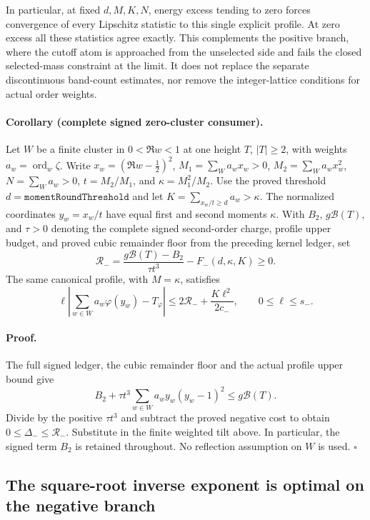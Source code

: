 In particular, at fixed \(d,M,K,N\), energy excess tending to zero forces
convergence of every Lipschitz statistic to this single explicit profile.
At zero excess all these statistics agree exactly.  This complements the
positive branch, where the cutoff atom is approached from the unselected
side and fails the closed selected-mass constraint at the limit.
It does not replace the separate discontinuous band-count estimates,
nor remove the integer-lattice conditions for actual order weights.

\paragraph{Corollary (complete signed zero-cluster consumer).}
Let \(W\) be a finite cluster in \(0<\Re w<1\) at one height \(T\),
\(|T|\ge2\), with weights \(a_w=\operatorname{ord}_w\zeta\).
Write \(x_w=(\Re w-\tfrac12)^2\),
\(M_1=\sum_Wa_wx_w>0\), \(M_2=\sum_Wa_wx_w^2\),
\(N=\sum_Wa_w>0\), \(t=M_2/M_1\), and
\(\kappa=M_1^2/M_2\).
Use the proved threshold \(d=\texttt{momentRoundThreshold}\) and let
\(K=\sum_{x_w/t\ge d}a_w>\kappa\).
The normalized coordinates \(y_w=x_w/t\) have equal first and
second moments \(\kappa\).
With \(B_2\), \(g\mathcal B(T)\), and \(\tau>0\) denoting the
complete signed second-order charge, profile upper budget, and proved
cubic remainder floor from the preceding kernel ledger, set
\[
 \mathcal R_-=
 \frac{g\mathcal B(T)-B_2}{\tau t^3}
       -F_-(d,\kappa,K)\ge0.
\]
The same canonical profile, with \(M=\kappa\), satisfies
\[
 \ell\left|\sum_{w\in W}a_w\varphi(y_w)-T_\varphi\right|
 \le2\mathcal R_-+\frac{K\ell^2}{2c_-},
 \qquad 0\le\ell\le s_-.
\]

\paragraph{Proof.}
The full signed ledger, the cubic remainder floor and the actual profile
upper bound give
\[
 B_2+\tau t^3\sum_{w\in W}a_wy_w(y_w-1)^2
 \le g\mathcal B(T).
\]
Divide by the positive \(\tau t^3\) and subtract the proved negative
cost to obtain \(0\le\Delta_-\le\mathcal R_-\).
Substitute in the finite weighted tilt above.
In particular, the signed term \(B_2\) is retained throughout.
No reflection assumption on \(W\) is used.
\hfill\(\square\)

\subsection{The square-root inverse exponent is optimal on the negative branch}
\label{subsec:negative-threshold-rate-sharpness}

